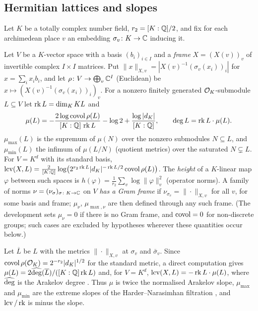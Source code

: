 \subsection{Hermitian lattices and slopes}\label{sec:covolume:lattices}

Let $K$ be a totally complex number field, $r_2=[K:\mathbb{Q}]/2$, and fix for each archimedean place $v$ an
embedding $\sigma_v\colon K\to\mathbb{C}$ inducing it.

\begin{definition}\label{def:covolume:slopes}
Let $V$ be a $K$-vector space with a basis $(b_i)_{i\in I}$ and a \emph{frame} $X=(X(v))_v$ of
invertible complex $I\times I$ matrices. Put $\|x\|_{X,v}=|X(v)^{-1}(\sigma_v(x_i))_i|$ for
$x=\sum_ix_ib_i$, and let $\rho\colon V\to\bigoplus_v\mathbb{C}^I$ (Euclidean) be
$x\mapsto(X(v)^{-1}(\sigma_v(x_i))_i)_v$. For a nonzero finitely generated $\mathcal{O}_K$-submodule
$L\subseteq V$ let $\operatorname{rk} L=\dim_KKL$ and
\[
\mu(L)=-\frac{2\log\operatorname{covol}\rho(L)}{[K:\mathbb{Q}]\,\operatorname{rk} L}-\log2+\frac{\log|d_K|}{[K:\mathbb{Q}]},\qquad
\deg L=\operatorname{rk} L\cdot\mu(L).
\]
$\mu_{\max}(L)$ is the supremum of $\mu(N)$ over the nonzero submodules $N\subseteq L$, and
$\mu_{\min}(L)$ the infimum of $\mu(L/N)$ (quotient metrics) over the saturated $N\subsetneq L$. For
$V=K^d$ with its standard basis,
$\operatorname{lcv}(X,L)=\frac2{[K:\mathbb{Q}]}\log\bigl(2^{r_2\operatorname{rk} L}|d_K|^{-\operatorname{rk} L/2}\operatorname{covol}\rho(L)\bigr)$.
The \emph{height} of a $K$-linear map $\varphi$ between such spaces is
$h(\varphi)=\frac1{r_2}\sum_v\log\|\varphi\|_v^2$ (operator norms). A family of norms
$\nu=(\nu_\sigma)_{\sigma\colon K\to\mathbb{C}}$ on $V$ \emph{has a Gram frame} if $\nu_{\sigma_v}=\|\cdot\|_{X,v}$
for all $v$, for some basis and frame; $\mu_\nu$, $\mu_{\max,\nu}$ are then defined through any such
frame. (The development sets $\mu_\nu=0$ if there is no Gram frame, and $\operatorname{covol}=0$ for non-discrete
groups; such cases are excluded by hypotheses wherever these quantities occur below.)
\end{definition}

\begin{remark}\label{rem:covolume:arakelov}
Let $\overline L$ be $L$ with the metrics $\|\cdot\|_{X,v}$ at $\sigma_v$ and $\bar\sigma_v$. Since
$\operatorname{covol}\rho(\mathcal{O}_K)=2^{-r_2}|d_K|^{1/2}$ for the standard metric, a direct computation gives
$\mu(L)=2\widehat{\operatorname{deg}}(\overline L)/([K:\mathbb{Q}]\operatorname{rk} L)$ and, for $V=K^d$,
$\operatorname{lcv}(X,L)=-\operatorname{rk} L\cdot\mu(L)$, where $\widehat{\operatorname{deg}}$ is the Arakelov degree
\cite{GilletSoule1992,Bost1996}. Thus $\mu$ is twice the normalised Arakelov slope, $\mu_{\max}$ and
$\mu_{\min}$ are the extreme slopes of the Harder--Narasimhan filtration \cite{Stuhler1976,Grayson1984},
and $\operatorname{lcv}/\operatorname{rk}$ is minus the slope.
\end{remark}

